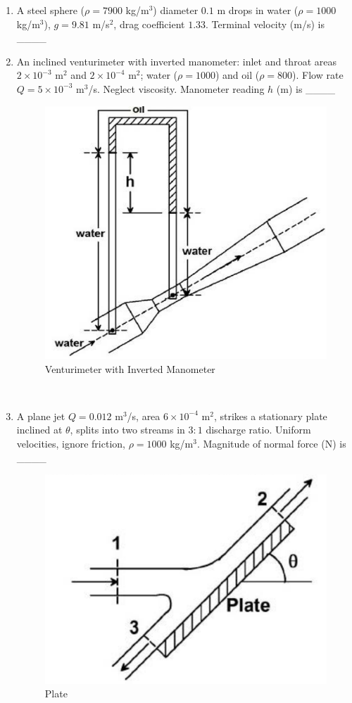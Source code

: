 \documentclass[journal,12pt,onecolumn]{IEEEtran}
\begin{document}
\begin{enumerate}[label=\arabic*)]
\item A steel sphere ($\rho=7900$ kg/m$^3$) diameter $0.1$ m drops in water ($\rho=1000$ kg/m$^3$), $g=9.81$ m/s$^2$, drag coefficient $1.33$. Terminal velocity (m/s) is \_\_\_\_
\hfill{} \\

\vspace{0.5cm}

\item An inclined venturimeter with inverted manometer: inlet and throat areas $2\times 10^{-3}$ m$^2$ and $2\times 10^{-4}$ m$^2$; water ($\rho=1000$) and oil ($\rho=800$). Flow rate $Q=5\times 10^{-3}$ m$^3$/s. Neglect viscosity. Manometer reading $h$ (m) is \_\_\_\_

\begin{figure}[htbp]
  \centering
  \includegraphics[width=.5\linewidth]{figs/B/fig7.png} 
  \caption{Venturimeter with Inverted Manometer}
  \label{B/fig7}
\end{figure}

\hfill{} \\

\vspace{0.5cm}

\item A plane jet $Q=0.012$ m$^3$/s, area $6\times 10^{-4}$ m$^2$, strikes a stationary plate inclined at $\theta$, splits into two streams in $3:1$ discharge ratio. Uniform velocities, ignore friction, $\rho=1000$ kg/m$^3$. Magnitude of normal force (N) is \_\_\_\_

\begin{figure}[htbp]
  \centering
  \includegraphics[width=.5\linewidth]{figs/B/fig8.png} 
  \caption{Plate}
  \label{B/fig8}
\end{figure}
\hfill{} \\

\end{enumerate}
\end{document}
